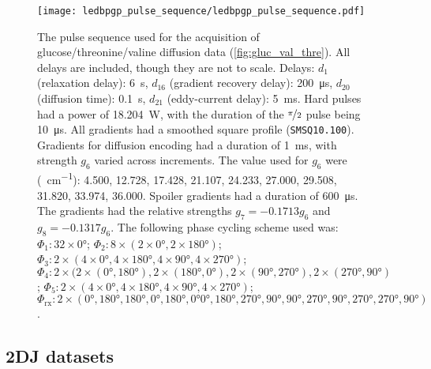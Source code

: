 \begin{figure}[H]
    \texttt{[image: ledbpgp\_pulse\_sequence/ledbpgp\_pulse\_sequence.pdf]}
    \caption[
        The pulse sequence used for the acquisition of glucose/threonine/valine
        diffusion data.
    ]{
        The pulse sequence used for the acquisition of glucose/threonine/valine
        diffusion data (\cref{fig:gluc_val_thre}). All
        delays are included, though they are not to scale.
        Delays:
        $d_1$ (relaxation delay): \qty{6}{\second},
        $d_{16}$ (gradient recovery delay): \qty{200}{\micro\second},
        $d_{20}$ (diffusion time): \qty{0.1}{\second},
        $d_{21}$ (eddy-current delay): \qty{5}{\milli\second}.
        Hard pulses had a power of \qty{18.204}{\watt},
        with the duration of the $\nicefrac{\pi}{2}$ pulse being
        \qty{10}{\micro\second}.
        All gradients had a smoothed square profile
        (\texttt{SMSQ10.100}).
        Gradients for diffusion encoding had a duration of
        \qty{1}{\milli\second}, with strength $g_6$ varied across increments.
        The value used for $g_6$ were (\unit{\gauss \per \centi \meter}):
        4.500,
        12.728,
        17.428,
        21.107,
        24.233,
        27.000,
        29.508,
        31.820,
        33.974,
        36.000.
        Spoiler gradients had a duration of \qty{600}{\micro\second}. The
        gradients had the relative strengths $g_7=-0.1713g_6$ and
        $g_8=-0.1317g_6$.
        The following phase cycling scheme used was:
        $\Phi_1: 32 \times \ang{0}$;
        $\Phi_2: 8 \times (2 \times \ang{0}, 2 \times \ang{180})$;
        $\Phi_3: 2 \times (4 \times \ang{0}, 4 \times \ang{180}, 4 \times \ang{90}, 4 \times \ang{270})$;
        $\Phi_4: 2 \times (2 \times (\ang{0}, \ang{180}), 2 \times (\ang{180}, \ang{0}), 2 \times (\ang{90}, \ang{270}), 2 \times (\ang{270}, \ang{90})$;
        $\Phi_5: 2 \times (4 \times \ang{0}, 4 \times \ang{180}, 4 \times \ang{90}, 4 \times \ang{270})$;
        $\Phi_{\text{rx}}: 2 \times (\ang{0}, \ang{180}, \ang{180}, \ang{0}, \ang{180}, \ang{0} \ang{0}, \ang{180},
        \ang{270}, \ang{90}, \ang{90}, \ang{270}, \ang{90}, \ang{270}, \ang{270}, \ang{90})$.
    }
    \label{fig:ledbpgp2s}
\end{figure}

\subsection{\acs{2DJ} datasets}
\label{subsec:cupid-experimental}

